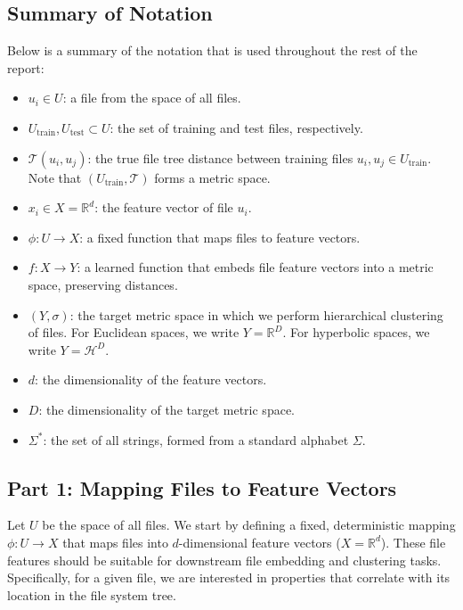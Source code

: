 \documentclass{article}
\begin{document}
\subsection{Summary of Notation}

Below is a summary of the notation that is used throughout the rest of the report:

\begin{itemize}
  \item $u_i \in U$: a file from the space of all files.
  \item $U_\text{train}, U_\text{test} \subset U$: the set of training and test files, respectively.
  \item $\mathcal T(u_i, u_j)$: the true file tree distance between training files $u_i, u_j \in U_\text{train}$. Note that $(U_\text{train}, \mathcal T)$ forms a metric space.
  \item $x_i \in X = \mathbb{R}^d$: the feature vector of file $u_i$.
  \item $\phi: U \to X$: a fixed function that maps files to feature vectors.
  \item $f: X \to Y$: a learned function that embeds file feature vectors into a metric space, preserving distances.
  \item $(Y, \sigma)$: the target metric space in which we perform hierarchical clustering of files. For Euclidean spaces, we write $Y = \mathbb R^D$. For hyperbolic spaces, we write $Y = \mathcal H^D$.
  \item $d$: the dimensionality of the feature vectors.
  \item $D$: the dimensionality of the target metric space.
  \item $\Sigma^*$: the set of all strings, formed from a standard alphabet $\Sigma$.
\end{itemize}

\subsection{Part 1: Mapping Files to Feature Vectors}

Let $U$ be the space of all files. We start by defining a fixed, deterministic mapping $\phi: U \to X$ that maps files into $d$-dimensional feature vectors ($X = \mathbb R^d$). These file features should be suitable for downstream file embedding and clustering tasks. Specifically, for a given file, we are interested in properties that correlate with its location in the file system tree.
\end{document}
